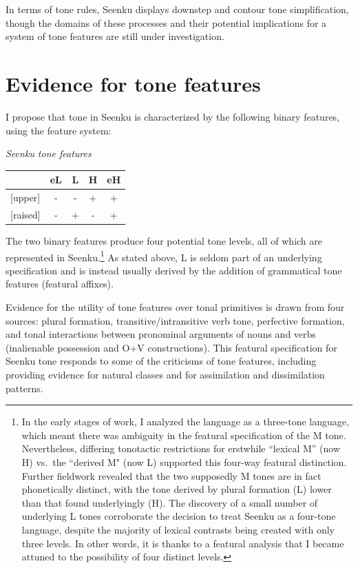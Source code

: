 \documentclass[output=paper]{langsci/langscibook}
\begin{document}
In terms of tone rules, Seenku displays downstep and contour tone simplification, though the domains of these processes and their potential implications for a system of tone features are still under investigation.


\section{Evidence for tone features}\label{sec:mcpherson:SecEvidence}

I propose that tone in Seenku is characterized by the following binary features, using the \citet{Pulleyblank86} feature system:

\ea\label{ex:mcpherson:5} {\it Seenku tone features} \\
\begin{tabular}[t]{|l|c|c|c|c|} \hline
   & eL & L & H & eH \\ \hline
  {[}upper{]} & - & - & + & + \\ \hline
  {[}raised{]} & - & + & - & + \\ \hline
\end{tabular}
\z

The two binary features produce four potential tone levels, all of which are represented in Seenku.\footnote{In the early stages of work, I analyzed the language as a three-tone language, which meant there was ambiguity in the featural specification of the M tone. Nevertheless, differing tonotactic restrictions for erstwhile ``lexical M'' (now H) vs.\ the ``derived M" (now L) supported this four-way featural distinction. Further fieldwork revealed that the two supposedly M tones are in fact phonetically distinct, with the tone derived by plural formation (L) lower than that found underlyingly (H). The discovery of a small number of underlying L tones corroborate the decision to treat Seenku as a four-tone language, despite the majority of lexical contrasts being created with only three levels. In other words, it is thanks to a featural analysis that I became attuned to the possibility of four distinct levels.} As stated above, L is seldom part of an underlying specification and is instead usually derived by the addition of grammatical tone features (featural affixes).

Evidence for the utility of tone features over tonal primitives is drawn from four sources: plural formation, transitive/intransitive verb tone, perfective formation, and tonal interactions between pronominal arguments of nouns and verbs (inalienable possession and O+V constructions). This featural specification for Seenku tone responds to some of the criticisms of tone features, including providing evidence for natural classes and for assimilation and dissimilation patterns.
\end{document}
